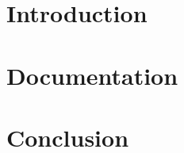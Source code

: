 \documentclass[12pt]{report}
\begin{document}


\tableofcontents

\chapter{Introduction}

\chapter{Documentation}

\pagebreak

\pagebreak

\chapter{Conclusion}



\printbibliography
\end{document}
